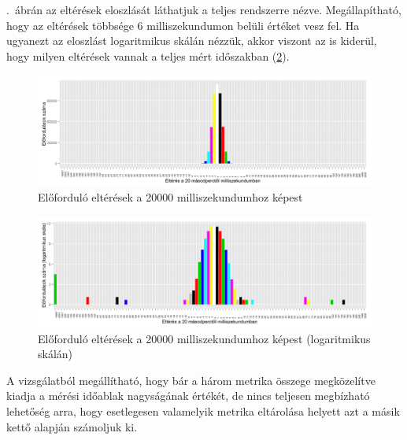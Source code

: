 \documentclass[a4paper,10pt,titlepage]{article}
\begin{document}
.~ábrán az eltérések eloszlását láthatjuk a teljes rendszerre nézve. Megállapítható, hogy az eltérések többsége 6 milliszekundumon belüli értéket vesz fel. Ha ugyanezt az eloszlást logaritmikus skálán nézzük, akkor viszont az is kiderül, hogy milyen eltérések vannak a teljes mért időszakban (\ref{fig:cpu_run_wait_ready-diff-dist-log}).

\begin{figure}[h!]
\centering
\includegraphics[width=1.00\textwidth]{figures/cpu_run_wait_ready-diff-dist-20120826230140-20120924083120.png}
\caption{ Előforduló eltérések a 20000 milliszekundumhoz képest \label{fig:cpu_run_wait_ready-diff-dist}}
\end{figure}

\begin{figure}[h!]
\centering
\includegraphics[width=1.00\textwidth]{figures/cpu_run_wait_ready-diff-dist-log-20120826230140-20120924083120.png}
\caption{ Előforduló eltérések a 20000 milliszekundumhoz képest (logaritmikus skálán)\label{fig:cpu_run_wait_ready-diff-dist-log}}
\end{figure}

A vizsgálatból megállítható, hogy bár a három metrika összege megközelítve kiadja a mérési időablak nagyságának értékét, de nincs teljesen megbízható lehetőség arra, hogy esetlegesen valamelyik metrika eltárolása helyett azt a másik kettő alapján számoljuk ki.
\end{document}
